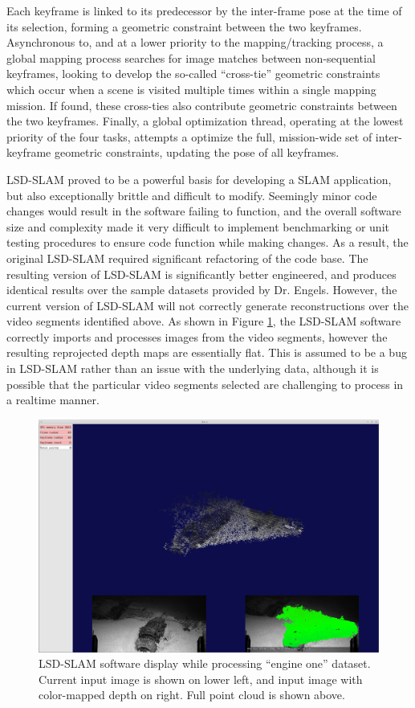 \documentclass[letterpaper,12pt]{article}
\begin{document}
Each keyframe is linked to its predecessor by the inter-frame pose at the time of its selection, forming a geometric constraint between the two keyframes.   Asynchronous to, and at a lower priority to the mapping/tracking process, a global mapping process searches for image matches between non-sequential keyframes, looking to develop the so-called ``cross-tie'' geometric constraints which occur when a scene is visited multiple times within a single mapping mission.   If found, these cross-ties also contribute geometric constraints between the two keyframes.     Finally, a global optimization thread, operating at the lowest priority of the four tasks, attempts a optimize the full, mission-wide set of inter-keyframe geometric constraints, updating the pose of all keyframes.   

LSD-SLAM proved to be a powerful basis for developing a SLAM application, but also exceptionally brittle and difficult to modify.  Seemingly minor code changes would result in the software failing to function, and the overall software size and complexity made it very difficult to implement benchmarking or unit testing procedures to ensure code function while making changes.   As a result, the original LSD-SLAM required significant refactoring of the code base.  The resulting version of LSD-SLAM is significantly better engineered, and produces identical results over the sample datasets provided by Dr. Engels.   However, the current version of LSD-SLAM will not correctly generate reconstructions over the video segments identified above.  As shown in Figure \ref{fig:lsd_slam_engine}, the LSD-SLAM software correctly imports and processes images from the video segments, however the resulting reprojected depth maps are essentially flat.   This is assumed to be a bug in LSD-SLAM rather than an issue with the underlying data, although it is possible that the particular video segments selected are challenging to process in a realtime manner.

\begin{figure}
    \centering
    \includegraphics[width=\textwidth]{images/lsd_slam_engine_two.png}
    \caption{LSD-SLAM software display while processing ``engine one'' dataset.    Current input image is shown on lower left, and input image with color-mapped depth on right.   Full point cloud is shown above.} 
    \label{fig:lsd_slam_engine}
\end{figure}
\end{document}
